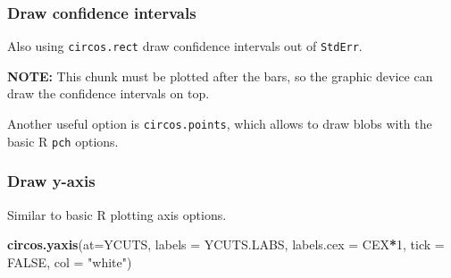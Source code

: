 \documentclass[
]{article}
\newenvironment{Shaded}{\begin{snugshade}}{\end{snugshade}}
\newcommand{\CommentTok}[1]{\textcolor[rgb]{0.56,0.35,0.01}{\textit{#1}}}
\newcommand{\DataTypeTok}[1]{\textcolor[rgb]{0.13,0.29,0.53}{#1}}
\newcommand{\DecValTok}[1]{\textcolor[rgb]{0.00,0.00,0.81}{#1}}
\newcommand{\FloatTok}[1]{\textcolor[rgb]{0.00,0.00,0.81}{#1}}
\newcommand{\KeywordTok}[1]{\textcolor[rgb]{0.13,0.29,0.53}{\textbf{#1}}}
\newcommand{\NormalTok}[1]{#1}
\newcommand{\OperatorTok}[1]{\textcolor[rgb]{0.81,0.36,0.00}{\textbf{#1}}}
\newcommand{\OtherTok}[1]{\textcolor[rgb]{0.56,0.35,0.01}{#1}}
\newcommand{\StringTok}[1]{\textcolor[rgb]{0.31,0.60,0.02}{#1}}
\begin{document}
\hypertarget{draw-confidence-intervals}{%
\subsubsection{Draw confidence
intervals}\label{draw-confidence-intervals}}

Also using \texttt{circos.rect} draw confidence intervals out of
\texttt{StdErr}.

\textbf{NOTE:} This chunk must be plotted after the bars, so the graphic
device can draw the confidence intervals on top.

\begin{Shaded}
\end{Shaded}

Another useful option is \texttt{circos.points}, which allows to draw
blobs with the basic R \texttt{pch} options.

\hypertarget{draw-y-axis}{%
\subsubsection{Draw y-axis}\label{draw-y-axis}}

Similar to basic R plotting axis options.

\begin{Shaded}
\begin{Highlighting}[]
\KeywordTok{circos.yaxis}\NormalTok{(}\DataTypeTok{at=}\NormalTok{YCUTS, }\DataTypeTok{labels =}\NormalTok{ YCUTS.LABS, }\DataTypeTok{labels.cex =}\NormalTok{ CEX}\OperatorTok{*}\DecValTok{1}\NormalTok{, }\DataTypeTok{tick =} \OtherTok{FALSE}\NormalTok{, }\DataTypeTok{col =} \StringTok{"white"}\NormalTok{)}
\end{Highlighting}
\end{Shaded}
\end{document}
